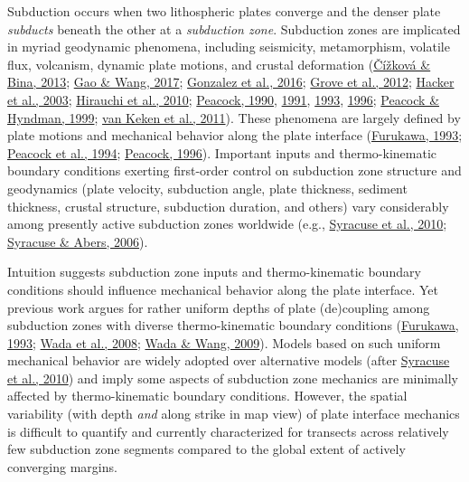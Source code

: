 Subduction occurs when two lithospheric plates converge and the denser plate \emph{subducts} beneath the other at a \emph{subduction zone}. Subduction zones are implicated in myriad geodynamic phenomena, including seismicity, metamorphism, volatile flux, volcanism, dynamic plate motions, and crustal deformation (\protect\hyperlink{ref-cizkova2013}{Čížková \& Bina, 2013}; \protect\hyperlink{ref-gao2017}{Gao \& Wang, 2017}; \protect\hyperlink{ref-gonzalez2016}{Gonzalez et al., 2016}; \protect\hyperlink{ref-grove2012}{Grove et al., 2012}; \protect\hyperlink{ref-hacker2003}{Hacker et al., 2003}; \protect\hyperlink{ref-hirauchi2010}{Hirauchi et al., 2010}; \protect\hyperlink{ref-peacock1990}{Peacock, 1990}, \protect\hyperlink{ref-peacock1991}{1991}, \protect\hyperlink{ref-peacock1993}{1993}, \protect\hyperlink{ref-peacock1996}{1996}; \protect\hyperlink{ref-peacock1999a}{Peacock \& Hyndman, 1999}; \protect\hyperlink{ref-vankeken2011}{van Keken et al., 2011}). These phenomena are largely defined by plate motions and mechanical behavior along the plate interface (\protect\hyperlink{ref-furukawa1993}{Furukawa, 1993}; \protect\hyperlink{ref-peacock1994}{Peacock et al., 1994}; \protect\hyperlink{ref-peacock1996}{Peacock, 1996}). Important inputs and thermo-kinematic boundary conditions exerting first-order control on subduction zone structure and geodynamics (plate velocity, subduction angle, plate thickness, sediment thickness, crustal structure, subduction duration, and others) vary considerably among presently active subduction zones worldwide (e.g., \protect\hyperlink{ref-syracuse2010}{Syracuse et al., 2010}; \protect\hyperlink{ref-syracuse2006}{Syracuse \& Abers, 2006}).

Intuition suggests subduction zone inputs and thermo-kinematic boundary conditions should influence mechanical behavior along the plate interface. Yet previous work argues for rather uniform depths of plate (de)coupling among subduction zones with diverse thermo-kinematic boundary conditions (\protect\hyperlink{ref-furukawa1993}{Furukawa, 1993}; \protect\hyperlink{ref-wada2008}{Wada et al., 2008}; \protect\hyperlink{ref-wada2009}{Wada \& Wang, 2009}). Models based on such uniform mechanical behavior are widely adopted over alternative models (after \protect\hyperlink{ref-syracuse2010}{Syracuse et al., 2010}) and imply some aspects of subduction zone mechanics are minimally affected by thermo-kinematic boundary conditions. However, the spatial variability (with depth \emph{and} along strike in map view) of plate interface mechanics is difficult to quantify and currently characterized for transects across relatively few subduction zone segments compared to the global extent of actively converging margins.

